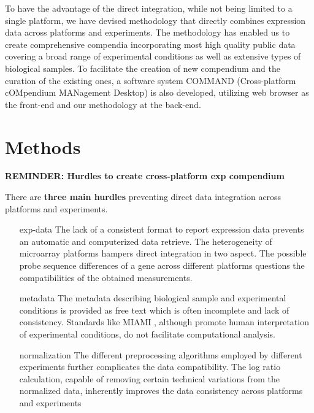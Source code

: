 To have the advantage of the direct integration, while not being limited to a 
single platform, we have devised methodology that directly combines 
expression data across platforms and experiments. 
The methodology has enabled us to create comprehensive compendia incorporating 
most high quality public data covering a broad range of experimental 
conditions as well as extensive types of biological samples. 
To facilitate the creation of new compendium and the curation of the existing 
ones, a software system COMMAND (Cross-platform cOMpendium MANagement Desktop) 
is also developed, utilizing web browser as the front-end and our methodology 
at the back-end. 







\section{Methods}


\textbf{REMINDER: Hurdles to create cross-platform exp compendium}

There are \textbf{three main hurdles} preventing direct data integration across
platforms and experiments.
%
\begin{itemize}
%
\item[exp-data] The lack of a consistent format to report expression data
  prevents an automatic and computerized data retrieve.
%
  The heterogeneity of microarray platforms hampers direct integration in two
  aspect.  The possible probe sequence differences of a gene across different
  platforms questions the compatibilities of the obtained measurements.
%
\item[metadata] The metadata describing biological sample and experimental
  conditions is provided as free text which is often incomplete and lack of
  consistency.  Standards like MIAMI \cite{Brazma2001, Brazma2009}, although
  promote human interpretation of experimental conditions, do not facilitate
  computational analysis.
%
\item[normalization] The different preprocessing algorithms employed by
  different experiments further complicates the data compatibility.
%
  The log ratio calculation, capable of removing certain technical variations
  from the normalized data, inherently improves the data consistency across
  platforms and experiments \cite{Shi2006, Shi2008}
%
\end{itemize}



